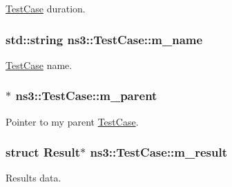 \hyperlink{classns3_1_1TestCase}{Test\+Case} duration. 

\subsubsection[{\texorpdfstring{m\+\_\+name}{m_name}}]{\setlength{\rightskip}{0pt plus 5cm}std\+::string ns3\+::\+Test\+Case\+::m\+\_\+name\hspace{0.3cm}{\ttfamily [private]}}\hypertarget{classns3_1_1TestCase_a0f7ecafa1c9cc538059169767453e4a4}{}\label{classns3_1_1TestCase_a0f7ecafa1c9cc538059169767453e4a4}


\hyperlink{classns3_1_1TestCase}{Test\+Case} name. 

\subsubsection[{\texorpdfstring{m\+\_\+parent}{m_parent}}]{$\ast$ ns3\+::\+Test\+Case\+::m\+\_\+parent\hspace{0.3cm}{\ttfamily [private]}}\hypertarget{classns3_1_1TestCase_a4b95b61d64e754a7e5720d1271e26b54}{}\label{classns3_1_1TestCase_a4b95b61d64e754a7e5720d1271e26b54}


Pointer to my parent \hyperlink{classns3_1_1TestCase}{Test\+Case}. 

\subsubsection[{\texorpdfstring{m\+\_\+result}{m_result}}]{\setlength{\rightskip}{0pt plus 5cm}struct {\bf Result}$\ast$ ns3\+::\+Test\+Case\+::m\+\_\+result\hspace{0.3cm}{\ttfamily [private]}}\hypertarget{classns3_1_1TestCase_addac5c48ae1626b527bb7d87155d2b4b}{}\label{classns3_1_1TestCase_addac5c48ae1626b527bb7d87155d2b4b}


Results data. 

